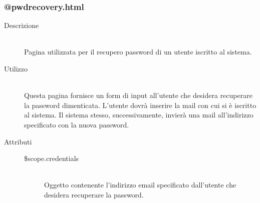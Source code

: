 \subsubsection{@pwdrecovery.html}
\begin{description}
	\item[Descrizione] \hfill \\
	Pagina utilizzata per il recupero password di un utente iscritto al sistema.
	\item[Utilizzo] \hfill \\
	Questa pagina fornisce un form di input all'utente che desidera recuperare la password dimenticata. L'utente dovrà inserire la mail con cui si è iscritto al sistema. Il sistema stesso, successivamente, invierà una mail all'indirizzo specificato con la nuova password.
	\item[Attributi] \hfill
 	\begin{description}
 		\item[\$scope.credentials] \hfill \\
 		Oggetto contenente l'indirizzo email specificato dall'utente che desidera recuperare la password.
 	\end{description}
\end{description}

